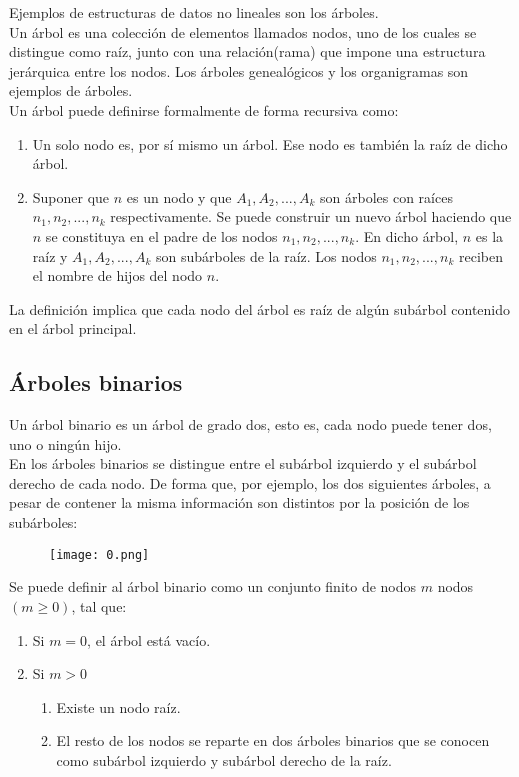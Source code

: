 \documentclass{article}
\begin{document}
Ejemplos de estructuras de datos no lineales son los árboles.\\

Un árbol es una colección de elementos llamados nodos, uno de los cuales se distingue como raíz, junto con una relación(rama)  que  impone  una  estructura  jerárquica  entre  los  nodos.  Los  árboles  genealógicos  y  los organigramas son ejemplos de árboles.\\

Un árbol puede definirse formalmente de forma recursiva como:
\begin{enumerate}
    \item Un solo nodo es, por sí mismo un árbol. Ese nodo es también la raíz de dicho árbol.
    \item Suponer que $n$ es un nodo y que $A_{1}, A_{2},...,A_{k}$ son árboles con raíces $n_{1}, n_{2},...,n_{k}$ respectivamente. Se puede construir un nuevo árbol haciendo que $n$ se constituya en el padre de los nodos $n_{1}, n_{2},...,n_{k}$. En dicho árbol, $n$ es la raíz y $A_{1}, A_{2},...,A_{k}$ son subárboles de la raíz. Los nodos $n_{1}, n_{2},...,n_{k}$ reciben el nombre de hijos del nodo $n$.
\end{enumerate}

La definición implica que cada nodo del árbol es raíz de algún subárbol contenido en el árbol principal.

\subsection{Árboles binarios}
Un árbol binario es un árbol de grado dos, esto es, cada nodo puede tener dos, uno o ningún hijo. \\

En los árboles binarios se distingue entre el subárbol izquierdo y el subárbol derecho de cada nodo. De forma que, por ejemplo, los dos siguientes árboles, a pesar de contener la misma información son distintos por la posición de los subárboles:
\begin{figure}[ht]
\centering
\texttt{[image: 0.png]}
\end{figure}

Se puede definir al árbol binario como un conjunto finito de nodos $m$ nodos $(m \geq 0)$, tal que:
\begin{enumerate}
    \item Si $m=0$, el árbol está vacío.
    \item Si $m>0$
    \begin{enumerate}
        \item Existe un nodo raíz.
        \item El resto de los nodos se reparte en dos árboles binarios que se conocen como subárbol izquierdo y subárbol derecho de la raíz.
    \end{enumerate}
\end{enumerate}
\end{document}
